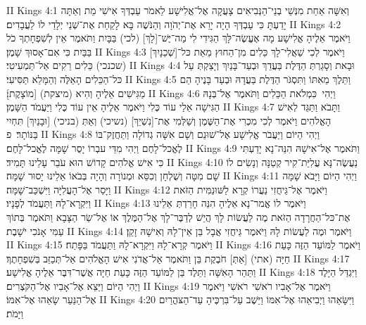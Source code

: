II Kings 4:1	וְאִשָּׁה אַחַת מִנְּשֵׁי בְנֵי־הַנְּבִיאִים צָעֲקָה אֶל־אֱלִישָׁע לֵאמֹר עַבְדְּךָ אִישִׁי מֵת וְאַתָּה יָדַעְתָּ כִּי עַבְדְּךָ הָיָה יָרֵא אֶת־יְהֹוָה וְהַנֹּשֶׁה בָּא לָקַחַת אֶת־שְׁנֵי יְלָדַי לוֹ לַעֲבָדִים׃
II Kings 4:2	וַיֹּאמֶר אֵלֶיהָ אֱלִישָׁע מָה אֶעֱשֶׂה־לָּךְ הַגִּידִי לִי מַה־יֶּשׁ־[לָךְ] (לכי) בַּבָּיִת וַתֹּאמֶר אֵין לְשִׁפְחָתְךָ כֹל בַּבַּיִת כִּי אִם־אָסוּךְ שָׁמֶן׃
II Kings 4:3	וַיֹּאמֶר לְכִי שַׁאֲלִי־לָךְ כֵּלִים מִן־הַחוּץ מֵאֵת כּל־[שְׁכֵנָיִךְ] (שכנכי) כֵּלִים רֵקִים אַל־תַּמְעִיטִי׃
II Kings 4:4	וּבָאת וְסָגַרְתְּ הַדֶּלֶת בַּעֲדֵךְ וּבְעַד־בָּנַיִךְ וְיָצַקְתְּ עַל כּל־הַכֵּלִים הָאֵלֶּה וְהַמָּלֵא תַּסִּיעִי׃
II Kings 4:5	וַתֵּלֶךְ מֵאִתּוֹ וַתִּסְגֹּר הַדֶּלֶת בַּעֲדָהּ וּבְעַד בָּנֶיהָ הֵם מַגִּישִׁים אֵלֶיהָ וְהִיא (מיצקת) [מוֹצָקֶת]׃
II Kings 4:6	וַיְהִי  כִּמְלֹאת הַכֵּלִים וַתֹּאמֶר אֶל־בְּנָהּ הַגִּישָׁה אֵלַי עוֹד כֶּלִי וַיֹּאמֶר אֵלֶיהָ אֵין עוֹד כֶּלִי וַיַּעֲמֹד הַשָּׁמֶן׃
II Kings 4:7	וַתָּבֹא וַתַּגֵּד לְאִישׁ הָאֱלֹהִים וַיֹּאמֶר לְכִי מִכְרִי אֶת־הַשֶּׁמֶן וְשַׁלְּמִי אֶת־[נִשְׁיֵךְ] (נשיכי) וְאַתְּ (בניכי) [וּבָנַיִךְ] תִּחְיִי בַּנּוֹתָר׃ {פ}
II Kings 4:8	וַיְהִי הַיּוֹם וַיַּעֲבֹר אֱלִישָׁע אֶל־שׁוּנֵם וְשָׁם אִשָּׁה גְדוֹלָה וַתַּחֲזֶק־בּוֹ לֶאֱכל־לָחֶם וַיְהִי מִדֵּי עבְרוֹ יָסֻר שָׁמָּה לֶאֱכל־לָחֶם׃
II Kings 4:9	וַתֹּאמֶר אֶל־אִישָׁהּ הִנֵּה־נָא יָדַעְתִּי כִּי אִישׁ אֱלֹהִים קָדוֹשׁ הוּא עֹבֵר עָלֵינוּ תָּמִיד׃
II Kings 4:10	נַעֲשֶׂה־נָּא עֲלִיַּת־קִיר קְטַנָּה וְנָשִׂים לוֹ שָׁם מִטָּה וְשֻׁלְחָן וְכִסֵּא וּמְנוֹרָה וְהָיָה בְּבֹאוֹ אֵלֵינוּ יָסוּר שָׁמָּה׃
II Kings 4:11	וַיְהִי הַיּוֹם וַיָּבֹא שָׁמָּה וַיָּסַר אֶל־הָעֲלִיָּה וַיִּשְׁכַּב־שָׁמָּה׃
II Kings 4:12	וַיֹּאמֶר אֶל־גֵּיחֲזִי נַעֲרוֹ קְרָא לַשּׁוּנַמִּית הַזֹּאת וַיִּקְרָא־לָהּ וַתַּעֲמֹד לְפָנָיו׃
II Kings 4:13	וַיֹּאמֶר לוֹ אֱמר־נָא אֵלֶיהָ הִנֵּה חָרַדְתְּ  אֵלֵינוּ אֶת־כּל־הַחֲרָדָה הַזֹּאת מֶה לַעֲשׂוֹת לָךְ הֲיֵשׁ לְדַבֶּר־לָךְ אֶל־הַמֶּלֶךְ אוֹ אֶל־שַׂר הַצָּבָא וַתֹּאמֶר בְּתוֹךְ עַמִּי אָנֹכִי יֹשָׁבֶת׃
II Kings 4:14	וַיֹּאמֶר וּמֶה לַעֲשׂוֹת לָהּ וַיֹּאמֶר גֵּיחֲזִי אֲבָל בֵּן אֵין־לָהּ וְאִישָׁהּ זָקֵן׃
II Kings 4:15	וַיֹּאמֶר קְרָא־לָהּ וַיִּקְרָא־לָהּ וַתַּעֲמֹד בַּפָּתַח׃
II Kings 4:16	וַיֹּאמֶר לַמּוֹעֵד הַזֶּה כָּעֵת חַיָּה (אתי) [אַתְּ] חֹבֶקֶת בֵּן וַתֹּאמֶר אַל־אֲדֹנִי אִישׁ הָאֱלֹהִים אַל־תְּכַזֵּב בְּשִׁפְחָתֶךָ׃
II Kings 4:17	וַתַּהַר הָאִשָּׁה וַתֵּלֶד בֵּן לַמּוֹעֵד הַזֶּה כָּעֵת חַיָּה אֲשֶׁר־דִּבֶּר אֵלֶיהָ אֱלִישָׁע׃
II Kings 4:18	וַיִּגְדַּל הַיָּלֶד וַיְהִי הַיּוֹם וַיֵּצֵא אֶל־אָבִיו אֶל־הַקֹּצְרִים׃
II Kings 4:19	וַיֹּאמֶר אֶל־אָבִיו רֹאשִׁי  רֹאשִׁי וַיֹּאמֶר אֶל־הַנַּעַר שָׂאֵהוּ אֶל־אִמּוֹ׃
II Kings 4:20	וַיִּשָּׂאֵהוּ וַיְבִיאֵהוּ אֶל־אִמּוֹ וַיֵּשֶׁב עַל־בִּרְכֶּיהָ עַד־הַצּהֳרַיִם וַיָּמֹת׃
